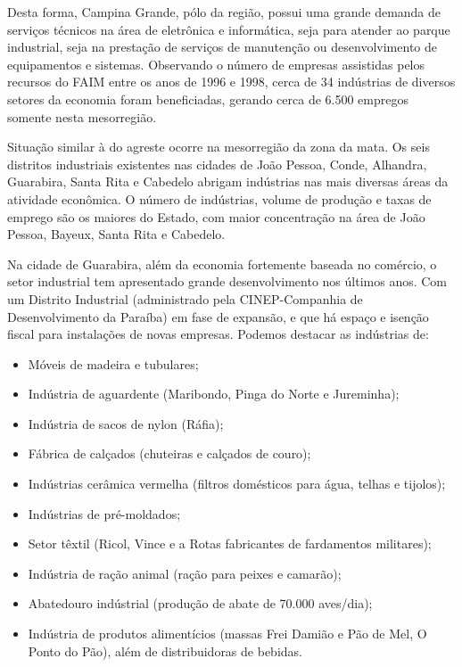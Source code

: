 	Desta forma, Campina Grande, pólo da região, possui uma grande demanda de serviços técnicos na área de eletrônica e inform\'atica, seja para atender ao parque industrial, seja na prestação de serviços de manutenção ou desenvolvimento de equipamentos e sistemas. Observando o número de empresas assistidas pelos recursos do FAIM entre os anos de 1996 e 1998, cerca de 34 indústrias de diversos setores da economia foram beneficiadas, gerando cerca de 6.500 empregos somente nesta mesorregião.


	Situação similar à do agreste ocorre na mesorregião da zona da mata. Os seis distritos industriais existentes nas cidades de João Pessoa, Conde, Alhandra, Guarabira, Santa Rita e Cabedelo abrigam indústrias nas mais diversas áreas da atividade econômica. O número de indústrias, volume de produção e taxas de emprego são os maiores do Estado, com maior concentração na área de João Pessoa, Bayeux, Santa Rita e Cabedelo.

	Na cidade de Guarabira, além da economia fortemente baseada no comércio, o setor industrial tem apresentado grande desenvolvimento nos últimos anos. Com um Distrito Industrial (administrado pela CINEP-Companhia de Desenvolvimento da Paraíba) em fase de expansão, e que há espaço e isenção fiscal para instalações de novas empresas. Podemos destacar as indústrias de:

\begin{itemize}

	\item Móveis de madeira e tubulares;
	\item Indústria de aguardente (Maribondo, Pinga do Norte e Jureminha);
	\item Indústria de sacos de nylon (Ráfia);
	\item Fábrica de calçados (chuteiras e calçados de couro);
	\item Indústrias cerâmica vermelha (filtros domésticos para água, telhas e tijolos);
	\item Indústrias de pré-moldados;
	\item Setor têxtil (Ricol, Vince e a Rotas fabricantes de fardamentos militares);
	\item Indústria de ração animal (ração para peixes e camarão);
	\item Abatedouro indústrial (produção de abate de 70.000 aves/dia);
	\item Ind\'ustria de produtos alimentícios (massas Frei Damião e Pão de Mel, O Ponto do Pão), além de distribuidoras de bebidas.

\end{itemize}

